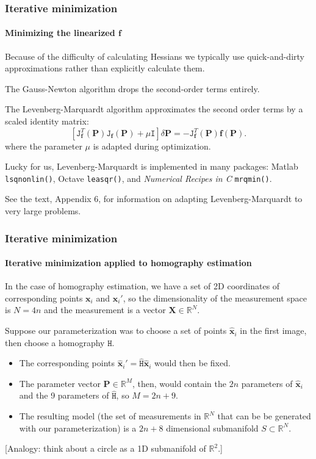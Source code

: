 \documentclass[aspectratio=169]{beamer}
\renewcommand{\vec}[1]{\boldsymbol{#1}}
\newcommand{\mat}[1]{\mathtt{#1}}
\def\Rset{\mathbb{R}}
\begin{document}
\begin{frame}
\frametitle{Iterative minimization}
\framesubtitle{Minimizing the linearized $\vec{f}$}

Because of the difficulty of calculating Hessians we typically use
quick-and-dirty approximations rather than explicitly calculate them.

\medskip

The \alert{Gauss-Newton} algorithm drops the second-order terms
entirely.

\medskip

The \alert{Levenberg-Marquardt} algorithm approximates the second
order terms by a scaled identity matrix:
\begin{equation*}
\left[ \mat{J}_{\vec{f}}^T(\vec{P})\mat{J}_{\vec{f}}(\vec{P}) +
\mu\mat{I} \right] \delta{\vec{P}} =
-\mat{J}^T_{\vec{f}}(\vec{P})\vec{f}(\vec{P}).
\end{equation*}
where the parameter $\mu$ is adapted during optimization.

\medskip

Lucky for us, Levenberg-Marquardt is implemented in many packages:
Matlab {\tt lsqnonlin()}, Octave {\tt leasqr()}, and {\em Numerical
Recipes in C} {\tt mrqmin()}.

\medskip

See the text, Appendix 6, for information on adapting
Levenberg-Marquardt to very large problems.

\end{frame}

\begin{frame}
\frametitle{Iterative minimization}
\framesubtitle{Iterative minimization applied to homography estimation}

In the case of \alert{homography estimation},
we have a set of 2D coordinates
of corresponding points $\vec{x}_i$ and $\vec{x}_i'$, so the
dimensionality of the \alert{measurement space} is $N=4n$ and the
measurement is a vector $\vec{X} \in \Rset^N$.

\medskip

Suppose our \alert{parameterization} was to choose a set of points
$\hat{\vec{x}}_i$ in the first image, then choose a homography
$\mat{H}$.
\begin{itemize}
\item The corresponding points
  $\hat{\vec{x}}_i'=\hat{\mat{H}}\hat{\vec{x}}_i$ would then be
  \alert{fixed}.
\item The \alert{parameter vector} $\vec{P} \in \Rset^M$, then, would
  contain the $2n$ parameters of $\hat{\vec{x}}_i$ and the 9
  parameters of $\hat{\mat{H}}$, so $M=2n+9$.
\item The resulting \alert{model} (the set of measurements in
  $\Rset^N$ that can be be generated with our parameterization) is a
  $2n+8$ dimensional submanifold $S \subset \Rset^N$.
\end{itemize}

\medskip

[Analogy: think about a circle as a 1D submanifold of $\Rset^2$.]

\end{frame}
\end{document}
